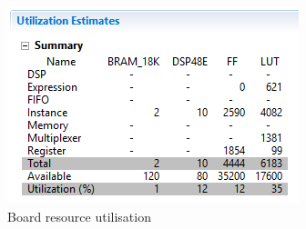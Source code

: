 \documentclass[12pt]{article} %
\begin{document}
\begin{figure}[h!]
  \centering
  \includegraphics[width=\linewidth]{figures/utilisation.jpg}
  \caption{Board resource utilisation}
  \label{Figure:utilisation}
\end{figure}

\printbibliography 
\end{document}
